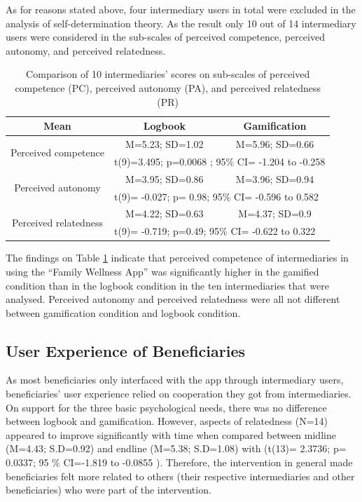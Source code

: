 As for reasons stated above, four intermediary users in total were excluded in the analysis of self-determination theory. As the result only 10 out of 14 intermediary users were considered in the sub-scales of perceived competence, perceived autonomy, and perceived relatedness.
\begin{table}[h!]
  \begin{center}
    \caption{Comparison of 10 intermediaries' scores on sub-scales of perceived competence (PC), perceived autonomy (PA), and perceived relatedness (PR)}
    \label{table:imiwellnessinterm}
	\begin{tabular}{|c|c|c|}
		\hline
		Mean &Logbook&Gamification\\
		\hline
		 \multirow{2}{*}{Perceived competence}&M=5.23; SD=1.02&M=5.96; SD=0.66\\\cline{2-3} 

		 &\multicolumn{2}{|l|}{t(9)=3.495; p=0.0068 ; 95\% CI= -1.204 to -0.258} \\
\hline
		 \multirow{2}{*}{Perceived autonomy}&M=3.95; SD=0.86&M=3.96; SD=0.94\\\cline{2-3} 

		 &\multicolumn{2}{|l|}{t(9)= -0.027; p= 0.98; 95\% CI= -0.596 to 0.582} \\
\hline

		 \multirow{2}{*}{Perceived relatedness}&M=4.22; SD=0.63&M=4.37; SD=0.9\\\cline{2-3} 
		 &\multicolumn{2}{|l|}{t(9)= -0.719; p=0.49; 95\% CI= -0.622 to 0.322 } \\
\hline
	\end{tabular}
  \end{center}
\end{table}
 
The findings on Table \ref{table:imiwellnessinterm} indicate that perceived competence of intermediaries in using the ``Family Wellness App'' was significantly higher in the gamified condition than in the logbook condition in the ten intermediaries that were analysed. Perceived autonomy and perceived relatedness were all not different between gamification condition and logbook condition. 

\subsection{User Experience of Beneficiaries}
As most beneficiaries only interfaced with the app through intermediary users, beneficiaries' user experience relied on cooperation they got from intermediaries. On support for the three basic psychological needs, there was no difference between logbook and gamification. However, aspects of relatedness (N=14) appeared to improve significantly with time when compared between midline (M=4.43; S.D=0.92) and endline (M=5.38; S.D=1.08) with (t(13)= 2.3736; p= 0.0337; 95 \% CI=-1.819 to -0.0855 ). Therefore, the intervention in general made beneficiaries felt more related to others (their respective intermediaries and other beneficiaries) who were part of the intervention.
  
